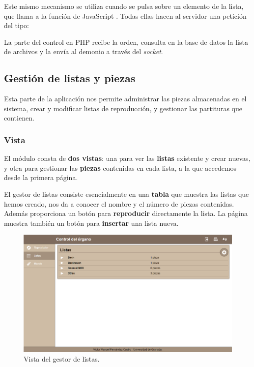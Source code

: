 Este mismo mecanismo se utiliza cuando se pulsa sobre un elemento de la lista, que llama a la función de JavaScript . Todas ellas hacen al servidor una petición del tipo: 

\begin{center}
\end{center}

La parte del control en \acrshort{PHP} recibe la orden, consulta en la base de datos la lista de archivos y la envía al demonio a través del \textit{socket}.

\subsection{Gestión de listas y piezas}
\label{subsec:impl_gestor}

Esta parte de la aplicación nos permite administrar las piezas almacenadas en el sistema, crear y modificar listas de reproducción, y gestionar las partituras que contienen.

\subsubsection{Vista}

El módulo consta de \textbf{dos vistas}: una para ver las \textbf{listas} existente y crear nuevas, y otra para gestionar las \textbf{piezas} contenidas en cada lista, a la que accedemos desde la primera página.

El gestor de listas consiste esencialmente en una \textbf{tabla} que muestra las listas que hemos creado, nos da a conocer el nombre y el número de piezas contenidas. Además proporciona un botón para \textbf{reproducir} directamente la lista. La página muestra también un botón para \textbf{insertar} una lista nueva.

\smallskip

\begin{figure}[H]
	\noindent \begin{centering}
		\includegraphics[width=\linewidth*3/4]{capitulo5/cap_listas}
		\par\end{centering}
	\smallskip
	\caption{\label{fig:cap_listas} Vista del gestor de listas.}
\end{figure} 

